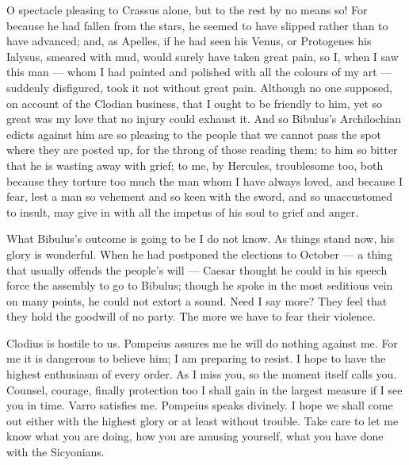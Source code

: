  O spectacle pleasing to Crassus alone, but to the rest by no means so! For because he had fallen from the stars, he seemed to have slipped rather than to have advanced; and, as Apelles, if he had seen his Venus, or Protogenes his Ialysus, smeared with mud, would surely have taken great pain, so I, when I saw this man --- whom I had painted and polished with all the colours of my art --- suddenly disfigured, took it not without great pain. Although no one supposed, on account of the Clodian business, that I ought to be friendly to him, yet so great was my love that no injury could exhaust it. And so Bibulus's Archilochian edicts against him are so pleasing to the people that we cannot pass the spot where they are posted up, for the throng of those reading them; to him so bitter that he is wasting away with grief; to me, by Hercules, troublesome too, both because they torture too much the man whom I have always loved, and because I fear, lest a man so vehement and so keen with the sword, and so unaccustomed to insult, may give in with all the impetus of his soul to grief and anger.

 What Bibulus's outcome is going to be I do not know. As things stand now, his glory is wonderful. When he had postponed the elections to October --- a thing that usually offends the people's will --- Caesar thought he could in his speech force the assembly to go to Bibulus; though he spoke in the most seditious vein on many points, he could not extort a sound. Need I say more? They feel that they hold the goodwill of no party. The more we have to fear their violence.

 Clodius is hostile to us. Pompeius assures me he will do nothing against me. For me it is dangerous to believe him; I am preparing to resist. I hope to have the highest enthusiasm of every order. As I miss you, so the moment itself calls you. Counsel, courage, finally protection too I shall gain in the largest measure if I see you in time. Varro satisfies me. Pompeius speaks divinely. I hope we shall come out either with the highest glory or at least without trouble. Take care to let me know what you are doing, how you are amusing yourself, what you have done with the Sicyonians.
